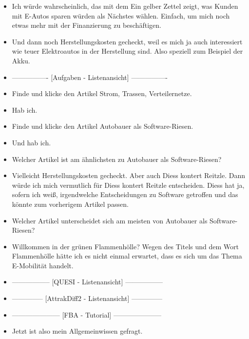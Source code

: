{\begin{itemize}[]
            \item {} Ich würde wahrscheinlich, das mit dem \flqq Ein gelber Zettel zeigt, was Kunden mit E-Autos sparen würden\frqq{} als Nächstes wählen.
                  Einfach, um mich noch etwas mehr mit der Finanzierung zu beschäftigen.
            \item {} Und dann noch \flqq Herstellungskosten\frqq{} gecheckt, weil es mich ja auch interessiert wie teuer Elektroautos in der Herstellung sind.
                  Also speziell zum Beispiel der Akku.
            \item {----------------} [Aufgaben - Listenansicht] {----------------}
            \item {} Finde und klicke den Artikel \flqq Strom, Trassen, Verteilernetze\frqq{}.
            \item {} Hab ich.
            \item {} Finde und klicke den Artikel \flqq Autobauer als Software-Riesen\frqq{}.
            \item {} Und hab ich.
            \item {} Welcher Artikel ist am ähnlichsten zu \flqq Autobauer als Software-Riesen\frqq{}?
            \item {} Vielleicht \flqq Herstellungskosten gecheckt\frqq{}.
                  Aber auch \flqq Diess kontert Reitzle\frqq{}.
                  Dann würde ich mich vermutlich für \flqq Diess kontert Reitzle\frqq{} entscheiden.
                  Diess hat ja, sofern ich weiß, irgendwelche Entscheidungen zu Software getroffen und das könnte zum vorherigem Artikel passen.
            \item {} Welcher Artikel unterscheidet sich am meisten von \flqq Autobauer als Software-Riesen\frqq{}?
            \item {} \flqq Willkommen in der grünen Flammenhölle\frqq{}?
                  Wegen des Titels und dem Wort Flammenhölle hätte ich es nicht einmal erwartet, dass es sich um das Thema E-Mobilität handelt.
            \item {-----------------} [QUESI - Listenansicht] {-----------------}
            \item {--------------} [AttrakDiff2 - Listenansicht] {--------------}
            \item {---------------------} [FBA - Tutorial] {---------------------}
            \item {} Jetzt ist also mein Allgemeinwissen gefragt.

\end{itemize}}
